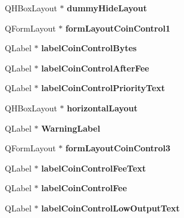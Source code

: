 \begin{DoxyCompactItemize}
Q\+H\+Box\+Layout $\ast$ {\bfseries dummy\+Hide\+Layout}
\item 
\mbox{\label{class_ui___privacy_dialog_a9fb99fd7b2995f5344314aab4b5a4829}} 
Q\+Form\+Layout $\ast$ {\bfseries form\+Layout\+Coin\+Control1}
\item 
\mbox{\label{class_ui___privacy_dialog_a5d6629db3c511fd00e0400f4a3d0766c}} 
Q\+Label $\ast$ {\bfseries label\+Coin\+Control\+Bytes}
\item 
\mbox{\label{class_ui___privacy_dialog_a7caf14a972e4f5769861d3eec35c1f01}} 
Q\+Label $\ast$ {\bfseries label\+Coin\+Control\+After\+Fee}
\item 
\mbox{\label{class_ui___privacy_dialog_a40b11451cdda65f77155778a1fd919e6}} 
Q\+Label $\ast$ {\bfseries label\+Coin\+Control\+Priority\+Text}
\item 
\mbox{\label{class_ui___privacy_dialog_a51cc9013f0aad7481869939a699c72d2}} 
Q\+H\+Box\+Layout $\ast$ {\bfseries horizontal\+Layout}
\item 
\mbox{\label{class_ui___privacy_dialog_a749260358b969ff9c23b4f7bef07cab1}} 
Q\+Label $\ast$ {\bfseries Warning\+Label}
\item 
\mbox{\label{class_ui___privacy_dialog_af3e0743b8ed279a572288ea72b1eabf8}} 
Q\+Form\+Layout $\ast$ {\bfseries form\+Layout\+Coin\+Control3}
\item 
\mbox{\label{class_ui___privacy_dialog_a29cb1eaa636d3ec1d7d56674dd6f08f6}} 
Q\+Label $\ast$ {\bfseries label\+Coin\+Control\+Fee\+Text}
\item 
\mbox{\label{class_ui___privacy_dialog_a2b27844e14fe2a07cbae7d787dcfca7a}} 
Q\+Label $\ast$ {\bfseries label\+Coin\+Control\+Fee}
\item 
\mbox{\label{class_ui___privacy_dialog_a00795ce622aca00b5990f6268c8e0db1}} 
Q\+Label $\ast$ {\bfseries label\+Coin\+Control\+Low\+Output\+Text}

\end{DoxyCompactItemize}
